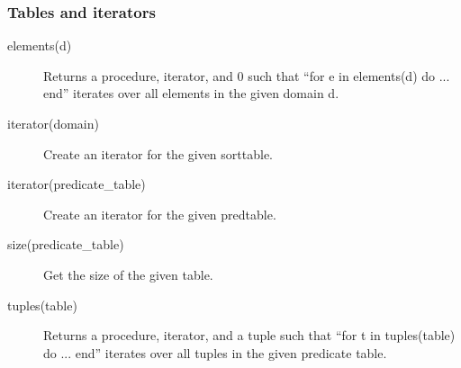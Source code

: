 \documentclass[a4]{article}
\begin{document}
\subsubsection{Tables and iterators}
\begin{description}
	\item[elements(d)]
		Returns a procedure, iterator, and 0 such that
			``for e in elements(d) do ... end'' 
		iterates over all elements in the given domain d.
	\item[iterator(domain)]
 		Create an iterator for the given sorttable.
	\item[iterator(predicate\_table)]
 		Create an iterator for the given predtable.
	\item[size(predicate\_table)]
 		Get the size of the given table.
	\item[tuples(table)]
 		Returns a procedure, iterator, and a tuple such that
 		``for t in tuples(table) do ... end''
 		iterates over all tuples in the given predicate table.
\end{description}
\end{document}
